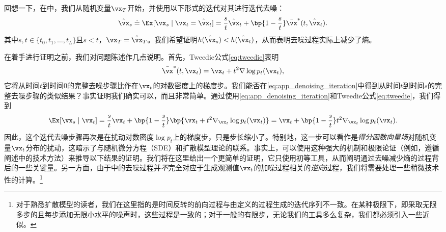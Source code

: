 \documentclass[../../book-main_zh.tex]{subfiles}
\begin{document}
回想一下，在中，我们从随机变量\(\vx_{T}\)开始，并使用以下形式的迭代对其进行迭代去噪：
\begin{equation}\label{eq:app_denoising_iteration}
    \hat{\vx}_{s} \doteq \Ex[\vx_{s} \mid \vx_{t} = \hat{\vx}_{t}] =
    \frac{s}{t}\hat{\vx}_{t} + \bp{1 -
    \frac{s}{t}}\bar{\vx}^{\ast}(t, \hat{\vx}_{t}).
\end{equation}
其中\(s, t \in \{t_{0}, t_{1}, \dots, t_{L}\}\)且\(s < t\)，\(\vx_{T} = \hat{\vx}_{T}\)。我们希望证明\(h(\hat{\vx}_{s}) < h(\hat{\vx}_{t})\)，从而表明去噪过程实际上减少了熵。

在着手进行证明之前，我们对问题陈述作几点说明。首先，Tweedie公式\eqref{eq:tweedie}表明
\begin{equation}
    \bar{\vx}^{\ast}(t, \vx_{t}) = \vx_{t} + t^{2}\nabla \log p_{t}(\vx_{t}),
\end{equation}
它将从时间\(t\)到时间\(0\)的完整去噪步骤比作在\(\vx_{t}\)的对数密度上的梯度步。我们能否在\eqref{eq:app_denoising_iteration}中得到从时间\(t\)到时间\(s\)的完整去噪步骤的类似结果？事实证明我们确实可以，而且非常简单。通过使用\eqref{eq:app_denoising_iteration}和Tweedie公式\eqref{eq:tweedie}，我们得到
\begin{equation}\label{eq:app_denoising_iteration_score}
    \Ex[\vx_{s} \mid \vx_{t}] = \frac{s}{t}\vx_{t} + \bp{1 -
    \frac{s}{t}}\bp{\vx_{t} + t^{2}\nabla_{\vx_{t}}\log
    p_{t}(\vx_{t})} = \vx_{t} + \bp{1 -
    \frac{s}{t}}t^{2}\nabla_{\vx_{t}}\log p_{t}(\vx_{t}).
\end{equation}
因此，这个迭代去噪步骤再次是在扰动对数密度\(\log p_{t}\)上的梯度步，只是步长缩小了。特别地，这一步可以看作是\textit{得分函数向量场}对随机变量\(\vx_{t}\)分布的扰动，这暗示了与随机微分方程（SDE）和扩散模型理论\cite{song2020score}的联系。事实上，可以使用这种强大的机制和极限论证（例如，遵循\cite{DBLP:conf/iclr/ChenC0LSZ23}阐述中的技术方法）来推导以下结果的证明。我们将在这里给出一个更简单的证明，它只使用初等工具，从而阐明通过去噪减少熵的过程背后的一些关键量。另一方面，由于中的去噪过程并\textit{不}完全对应于生成观测值\(\vx_{t}\)的加噪过程相关的\textit{逆向}过程，我们将需要处理一些稍微技术性的计算。\footnote{对于熟悉扩散模型的读者，我们在这里指的是时间反转的前向过程与由定义的过程生成的迭代序列不一致。在某种极限下，即采取无限多步的且每步添加无限小水平的噪声时，这些过程是一致的；对于一般的有限步，无论我们的工具多么复杂，我们都必须引入一些近似。}
\end{document}
